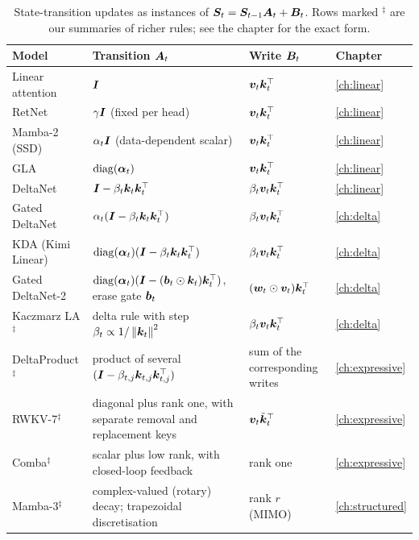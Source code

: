 \begin{table}[t]
\centering\small
\caption{State-transition updates as instances of $\bm{S}_t = \bm{S}_{t-1}\bm{A}_t + \bm{B}_t$. Rows marked
$^{\ddagger}$ are our summaries of richer rules; see the chapter for the exact form.}
\label{tab:c02-transitions}
\begin{tabularx}{\textwidth}{@{}>{\raggedright\arraybackslash}p{3.4cm}>{\raggedright\arraybackslash}X>{\raggedright\arraybackslash}p{2.6cm}l@{}}
\toprule
Model & Transition $\bm{A}_t$ & Write $\bm{B}_t$ & Chapter \\
\midrule
Linear attention & $\bm{I}$ & $\bm{v}_t\bm{k}_t^{\top}$ & \cref{ch:linear} \\
RetNet & $\gamma\bm{I}$ (fixed per head) & $\bm{v}_t\bm{k}_t^{\top}$ & \cref{ch:linear} \\
Mamba-2 (SSD) & $\alpha_t\bm{I}$ (data-dependent scalar) & $\bm{v}_t\bm{k}_t^{\top}$ & \cref{ch:linear} \\
GLA & $\operatorname{diag}(\bm{\alpha}_t)$ & $\bm{v}_t\bm{k}_t^{\top}$ & \cref{ch:linear} \\
DeltaNet & $\bm{I} - \beta_t\bm{k}_t\bm{k}_t^{\top}$ & $\beta_t\bm{v}_t\bm{k}_t^{\top}$ & \cref{ch:linear} \\
Gated DeltaNet & $\alpha_t(\bm{I} - \beta_t\bm{k}_t\bm{k}_t^{\top})$ & $\beta_t\bm{v}_t\bm{k}_t^{\top}$ & \cref{ch:delta} \\
KDA (Kimi Linear) & $\operatorname{diag}(\bm{\alpha}_t)(\bm{I} - \beta_t\bm{k}_t\bm{k}_t^{\top})$ & $\beta_t\bm{v}_t\bm{k}_t^{\top}$ & \cref{ch:delta} \\
Gated DeltaNet-2 & $\operatorname{diag}(\bm{\alpha}_t)(\bm{I} - (\bm{b}_t\odot\bm{k}_t)\bm{k}_t^{\top})$, erase gate $\bm{b}_t$ &
$(\bm{w}_t\odot\bm{v}_t)\bm{k}_t^{\top}$ & \cref{ch:delta} \\
Kaczmarz LA$^{\ddagger}$ & delta rule with step $\beta_t \propto 1/\left\lVert \bm{k}_t\right\rVert^2$ &
$\beta_t\bm{v}_t\bm{k}_t^{\top}$ & \cref{ch:delta} \\
DeltaProduct$^{\ddagger}$ & product of several $(\bm{I} - \beta_{t,j}\bm{k}_{t,j}\bm{k}_{t,j}^{\top})$ & sum of
the corresponding writes & \cref{ch:expressive} \\
RWKV-7$^{\ddagger}$ & diagonal plus rank one, with separate removal and replacement keys &
$\bm{v}_t\tilde{\bm{k}}_t^{\top}$ & \cref{ch:expressive} \\
Comba$^{\ddagger}$ & scalar plus low rank, with closed-loop feedback & rank one &
\cref{ch:expressive} \\
Mamba-3$^{\ddagger}$ & complex-valued (rotary) decay; trapezoidal discretisation & rank $r$ (MIMO) &
\cref{ch:structured} \\
\bottomrule
\end{tabularx}
\end{table}

